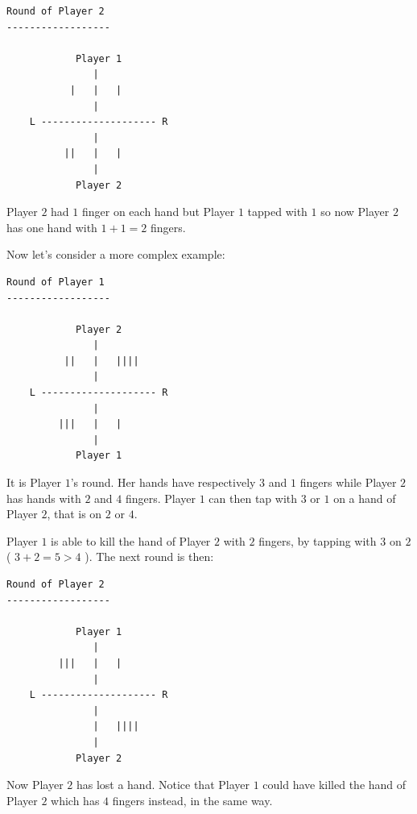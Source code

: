 \documentclass{article}
\begin{document}
\begin{verbatim}
Round of Player 2
------------------

            Player 1                
               |                    
           |   |   |                
               |                    
    L -------------------- R        
               |                    
          ||   |   |                
               |                    
            Player 2                

\end{verbatim}{}

Player $2$ had $1$ finger on each hand but Player $1$ tapped with $1$ so now Player $2$ has one hand with $1+1 = 2$ fingers.

Now let's consider a more complex example:

\begin{verbatim}
Round of Player 1
------------------

            Player 2                
               |                    
          ||   |   ||||             
               |                    
    L -------------------- R        
               |                    
         |||   |   |                
               |                    
            Player 1                

\end{verbatim}{}

It is Player $1$'s round. Her hands have respectively $3$ and $1$ fingers while Player $2$ has hands with $2$ and $4$ fingers. Player $1$ can then tap with $3$ or $1$ on a hand of Player $2$, that is on $2$ or $4$.

Player $1$ is able to kill the hand of Player $2$ with $2$ fingers, by tapping with $3$ on $2$ ( $3+2 = 5 > 4$ ). The next round is then:

\begin{verbatim}
Round of Player 2
------------------

            Player 1                
               |                    
         |||   |   |                
               |                    
    L -------------------- R        
               |                    
               |   ||||             
               |                    
            Player 2                

\end{verbatim}{}

Now Player $2$ has lost a hand. Notice that Player $1$ could have killed the hand of Player $2$ which has $4$ fingers instead, in the same way.
\end{document}
